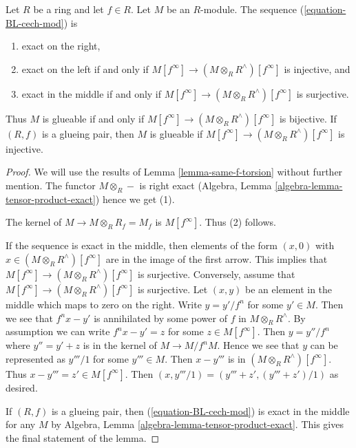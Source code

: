 \begin{lemma}
\label{lemma-same-f-torsion-module}
Let $R$ be a ring and let $f \in R$. Let $M$ be an $R$-module.
The sequence (\ref{equation-BL-cech-mod}) is
\begin{enumerate}
\item exact on the right,
\item exact on the left if and only if
$M[f^\infty] \to (M \otimes_R R^\wedge)[f^\infty]$
is injective, and
\item exact in the middle if and only if
$M[f^\infty] \to (M \otimes_R R^\wedge)[f^\infty]$
is surjective.
\end{enumerate}
Thus $M$ is glueable if and only if
$M[f^\infty] \to (M \otimes_R R^\wedge)[f^\infty]$
is bijective. If $(R, f)$ is a glueing pair, then $M$ is glueable
if $M[f^\infty] \to (M \otimes_R R^\wedge)[f^\infty]$ is 
injective.
\end{lemma}

\begin{proof}
We will use the results of Lemma \ref{lemma-same-f-torsion} without
further mention. The functor $M \otimes_R -$ is right exact
(Algebra, Lemma \ref{algebra-lemma-tensor-product-exact})
hence we get (1).

\medskip\noindent
The kernel of $M \to M \otimes_R R_f = M_f$ is $M[f^\infty]$.
Thus (2) follows.

\medskip\noindent
If the sequence is exact in the middle, then elements of the form
$(x, 0)$ with $x \in (M \otimes_R R^\wedge)[f^\infty]$ are in the image of
the first arrow. This implies that
$M[f^\infty] \to (M \otimes_R R^\wedge)[f^\infty]$
is surjective. Conversely, assume that
$M[f^\infty] \to (M \otimes_R R^\wedge)[f^\infty]$
is surjective. Let $(x, y)$ be an element in the middle
which maps to zero on the right. Write $y = y'/f^n$ for some $y' \in M$.
Then we see that $f^n x - y'$ is annihilated by some power of $f$ in
$M \otimes_R R^\wedge$. By assumption we can write $f^nx - y' = z$ for some
$z \in M[f^\infty]$. Then $y = y''/f^n$ where $y'' = y' + z$
is in the kernel of $M \to M/f^nM$. Hence we see that $y$ can be
represented as $y'''/1$ for some $y''' \in M$. Then
$x - y'''$ is in $(M \otimes_R R^\wedge)[f^\infty]$.
Thus $x - y''' = z' \in M[f^\infty]$.
Then $(x, y'''/1) = (y''' + z', (y''' + z')/1)$ as desired.

\medskip\noindent
If $(R, f)$ is a glueing pair, then (\ref{equation-BL-cech-mod})
is exact in the middle for any $M$ by
Algebra, Lemma \ref{algebra-lemma-tensor-product-exact}.
This gives the final statement of the lemma.
\end{proof}

